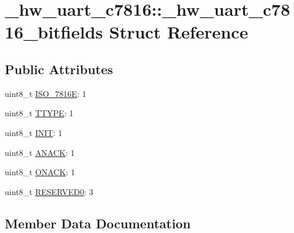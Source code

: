 \hypertarget{struct__hw__uart__c7816_1_1__hw__uart__c7816__bitfields}{}\section{\+\_\+hw\+\_\+uart\+\_\+c7816\+:\+:\+\_\+hw\+\_\+uart\+\_\+c7816\+\_\+bitfields Struct Reference}
\label{struct__hw__uart__c7816_1_1__hw__uart__c7816__bitfields}
\subsection*{Public Attributes}
\begin{DoxyCompactItemize}
\item 
uint8\+\_\+t \hyperlink{struct__hw__uart__c7816_1_1__hw__uart__c7816__bitfields_a1dc1e94eac1b05f1a52f3e2322cd840d}{I\+S\+O\+\_\+7816E}\+: 1
\item 
uint8\+\_\+t \hyperlink{struct__hw__uart__c7816_1_1__hw__uart__c7816__bitfields_a0c2ad54ab3c3b251db7f8f2c7c0a473a}{T\+T\+Y\+PE}\+: 1
\item 
uint8\+\_\+t \hyperlink{struct__hw__uart__c7816_1_1__hw__uart__c7816__bitfields_a83aab3990af8d97b1d7151af989ab349}{I\+N\+IT}\+: 1
\item 
uint8\+\_\+t \hyperlink{struct__hw__uart__c7816_1_1__hw__uart__c7816__bitfields_af9411ac7a235f9159e59e505899e7bc0}{A\+N\+A\+CK}\+: 1
\item 
uint8\+\_\+t \hyperlink{struct__hw__uart__c7816_1_1__hw__uart__c7816__bitfields_aab64c95bc1377e204598bee46957ade7}{O\+N\+A\+CK}\+: 1
\item 
uint8\+\_\+t \hyperlink{struct__hw__uart__c7816_1_1__hw__uart__c7816__bitfields_a16d6b831175a4c494e3145ef6cef56a0}{R\+E\+S\+E\+R\+V\+E\+D0}\+: 3
\end{DoxyCompactItemize}


\subsection{Member Data Documentation}
